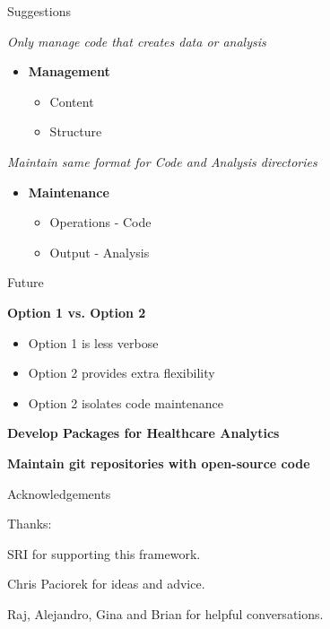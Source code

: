 \documentclass{beamer}
\begin{document}
\begin{frame}{Suggestions}

\emph{Only manage code that creates data or analysis}

\begin{itemize}

\item \textbf{Management}
\begin{itemize}
\item Content
\item Structure
\end{itemize}
\bigskip
\end{itemize}
\emph{ Maintain same format for  Code and Analysis directories}
\begin{itemize}
\item \textbf{Maintenance}
\begin{itemize}
\item Operations - Code
\item Output - Analysis
\end{itemize}

\end{itemize}

\end{frame}

\begin{frame}{Future}

\textbf{Option 1 vs. Option 2}
\begin{itemize}
\item Option 1 is less verbose
\item Option 2 provides extra flexibility
\item Option 2 isolates code maintenance
\end{itemize}
\bigskip

\textbf{Develop Packages for Healthcare Analytics}
\bigskip

\textbf{Maintain git repositories with open-source code}

\end{frame}

\begin{frame}{Acknowledgements}

Thanks:

\bigskip

SRI for supporting this framework.\\
\bigskip

Chris Paciorek for ideas and advice.\\
\bigskip

Raj, Alejandro, Gina and Brian for helpful conversations.\\
 
\end{frame}
\end{document}
